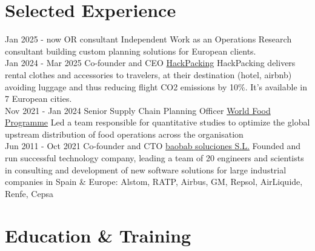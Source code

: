 \documentclass[letterpaper]{twentysecondcv} %
\begin{document}
\makeprofile %


\section{Selected Experience}

\begin{twenty} %
\twentyitem
      {Jan 2025 -}
    {now}
        {OR consultant}
        {Independent}
        {}
        {Work as an Operations Research consultant building custom planning solutions for European clients.
        }
        \\
\twentyitem
      {Jan 2024 -}
    {Mar 2025}
        {Co-founder and CEO}
        {\href{https://hack-packing.com/}{HackPacking}}
        {}
        {HackPacking delivers rental clothes and accessories to travelers, at their destination (hotel, airbnb) avoiding luggage and thus reducing flight CO2 emissions by 10\%. It's available in 7 European cities.
        }
        \\
\twentyitem
      {Nov 2021 -}
    {Jan 2024}
        {Senior Supply Chain Planning Officer}
        {\href{http://www.wfp.org/}{World Food Programme}}
        {}
        {Led a team responsible for quantitative studies to optimize the global upstream distribution of food operations across the organisation
        }
        \\
	\twentyitem
    	{Jun 2011 -}
		{Oct 2021}
        {Co-founder and CTO}
        {\href{https://baobabsoluciones.es/en/}{baobab soluciones S.L.}}
        {}
        {Founded and run successful technology company, leading a team of 20 engineers and scientists in consulting and development of new software solutions for large industrial companies in Spain \& Europe: Alstom, RATP, Airbus, GM, Repsol, AirLiquide, Renfe, Cepsa
        }
\end{twenty}

\section{Education \& Training}
\end{document}
